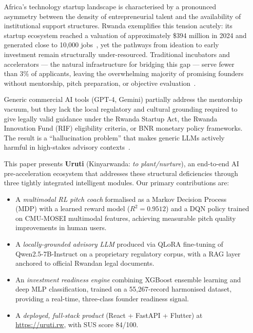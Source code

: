 \documentclass{article}
\begin{document}
Africa's technology startup landscape is characterised by a pronounced asymmetry
between the density of entrepreneurial talent and the availability of
institutional support structures. Rwanda exemplifies this tension acutely:
its startup ecosystem reached a valuation of approximately \$394 million in 2024
and generated close to 10{,}000 jobs~\citep{africa2025}, yet the pathways from
ideation to early investment remain structurally under-resourced.
Traditional incubators and accelerators — the natural infrastructure for bridging
this gap — serve fewer than 3\% of applicants, leaving the overwhelming majority
of promising founders without mentorship, pitch preparation, or objective
evaluation~\citep{otis2024}.

Generic commercial AI tools (GPT-4, Gemini) partially address the mentorship
vacuum, but they lack the local regulatory and cultural grounding required to
give legally valid guidance under the Rwanda Startup Act, the Rwanda
Innovation Fund (RIF) eligibility criteria, or BNR monetary policy frameworks.
The result is a ``hallucination problem'' that makes generic LLMs actively
harmful in high-stakes advisory contexts~\citep{murekatete2026}.

This paper presents \textbf{Uruti} (Kinyarwanda: \emph{to plant/nurture}),
an end-to-end AI pre-acceleration ecosystem that addresses these structural
deficiencies through three tightly integrated intelligent modules. Our primary
contributions are:

\begin{itemize}
    \item A \emph{multimodal RL pitch coach} formalised as a Markov Decision
    Process (MDP) with a learned reward model ($R^2 = 0.9512$) and a DQN policy
    trained on CMU-MOSEI multimodal features, achieving measurable pitch quality
    improvements in human users.

    \item A \emph{locally-grounded advisory LLM} produced via QLoRA fine-tuning
    of Qwen2.5-7B-Instruct on a proprietary regulatory corpus, with a
    RAG layer anchored to official Rwandan legal documents.

    \item An \emph{investment readiness engine} combining XGBoost ensemble
    learning and deep MLP classification, trained on a 55{,}267-record
    harmonised dataset, providing a real-time, three-class founder readiness
    signal.

    \item A \emph{deployed, full-stack product} (React + FastAPI + Flutter)
    at \url{https://uruti.rw}, with SUS score 84/100.
\end{itemize}
\end{document}
